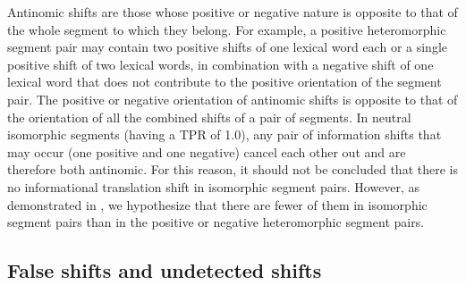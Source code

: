 \documentclass[output=paper]{langsci/langscibook}
\begin{document}
Antinomic shifts are those whose positive or negative nature is opposite to that of the whole segment to which they belong. For example, a positive heteromorphic segment pair may contain two positive shifts of one lexical word each or a single positive shift of two lexical words, in combination with a negative shift of one lexical word that does not contribute to the positive orientation of the segment pair. The positive or negative orientation of antinomic shifts is opposite to that of the orientation of all the combined shifts of a pair of segments. In neutral isomorphic segments (having a TPR of 1.0), any pair of information shifts that may occur (one positive and one negative) cancel each other out and are therefore both antinomic. For this reason, it should not be concluded that there is no informational translation shift in isomorphic segment pairs. However, as demonstrated in , we hypothesize that there are fewer of them in isomorphic segment pairs than in the positive or negative heteromorphic segment pairs.

\subsection{False shifts and undetected shifts}
\end{document}
